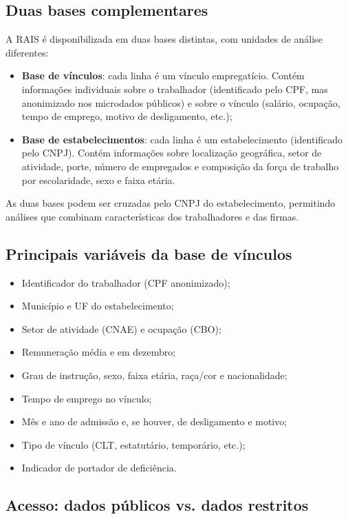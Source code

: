 \subsection{Duas bases complementares}

A RAIS é disponibilizada em duas bases distintas, com unidades de análise diferentes:

\begin{itemize}
  \item \textbf{Base de vínculos}: cada linha é um vínculo empregatício. Contém informações individuais sobre o trabalhador (identificado pelo CPF, mas anonimizado nos microdados públicos) e sobre o vínculo (salário, ocupação, tempo de emprego, motivo de desligamento, etc.);
  \item \textbf{Base de estabelecimentos}: cada linha é um estabelecimento (identificado pelo CNPJ). Contém informações sobre localização geográfica, setor de atividade, porte, número de empregados e composição da força de trabalho por escolaridade, sexo e faixa etária.
\end{itemize}

As duas bases podem ser cruzadas pelo CNPJ do estabelecimento, permitindo análises que combinam características dos trabalhadores e das firmas.

\subsection{Principais variáveis da base de vínculos}

\begin{itemize}
  \item Identificador do trabalhador (CPF anonimizado);
  \item Município e UF do estabelecimento;
  \item Setor de atividade (CNAE) e ocupação (CBO);
  \item Remuneração média e em dezembro;
  \item Grau de instrução, sexo, faixa etária, raça/cor e nacionalidade;
  \item Tempo de emprego no vínculo;
  \item Mês e ano de admissão e, se houver, de desligamento e motivo;
  \item Tipo de vínculo (CLT, estatutário, temporário, etc.);
  \item Indicador de portador de deficiência.
\end{itemize}

\subsection{Acesso: dados públicos vs. dados restritos}

